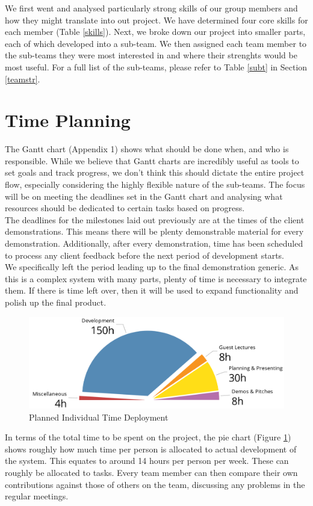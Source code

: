 \documentclass[a4paper,10pt,DIV10,openright,openbib]{scrreprt}
\begin{document}
We first went and analysed particularly strong skills of our group members and how they might translate 
into out project. We have determined four core skills for each member (Table \ref{skills}). Next, we broke down
our project into smaller parts, each of which developed into a sub-team. We then assigned each team member 
to the sub-teams they were most interested in and where their strenghts would be most useful. For a full
list of the sub-teams, please refer to Table \ref{subt} in Section \ref{teamstr}.


\section{Time Planning}



The Gantt chart (Appendix 1) shows what should be done when, and who is responsible.
While we believe that Gantt charts are incredibly useful as tools to set goals and track
progress, we don't think this should dictate the entire project flow, especially considering
the highly flexible nature of the sub-teams. The focus will be on meeting the deadlines set
in the Gantt chart and analysing what resources should be dedicated to certain
tasks based on progress.\\
The deadlines for the milestones laid out previously are at the times of the client demonstrations.
This means there will be plenty demonstrable material for every demonstration. Additionally,
after every demonstration, time has been scheduled to process any client feedback before the
next period of development starts.\\
We specifically left the period leading up to the final demonstration generic.
As this is a complex system with many parts, plenty of time is necessary to integrate them.
If there is time left over, then it will be used to expand functionality and polish up the final product.\\
\begin{figure}[h]
  \includegraphics[width=\textwidth]{pie.png}
  \caption{Planned Individual Time Deployment}
  \label{piec}
\end{figure}
In terms of the total time to be spent on the project, the pie chart (Figure \ref{piec}) shows roughly how
much time per person is allocated to actual development of the system. This equates to around
14 hours per person per week. These can roughly be allocated to tasks. Every
team member
can then  compare their own contributions against those of others on the team, discussing any
problems in the regular meetings.
\end{document}
